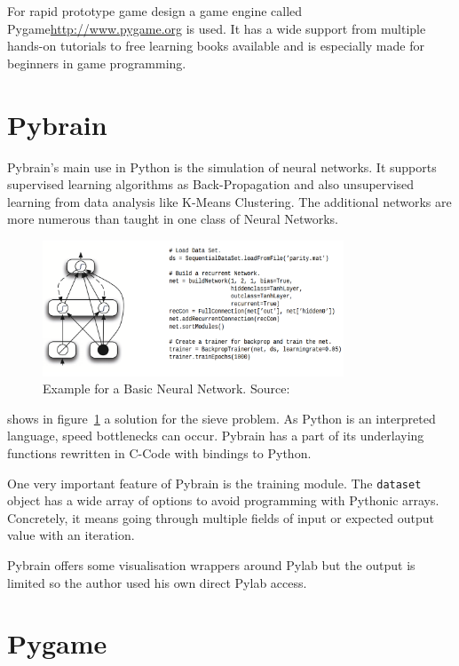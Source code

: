 \documentclass[bibtotocnumbered, headsepline,normalheadings,12pt]{report}
\begin{document}
For rapid prototype game design a game engine called Pygame\url{http://www.pygame.org} is used. It has a wide support from multiple 
hands-on tutorials to free learning books available and is especially made for beginners in game programming.

\section{Pybrain}

Pybrain's main use in Python is the simulation of neural networks. It supports supervised learning algorithms as Back-Propagation
and also unsupervised learning from data analysis like K-Means Clustering. The additional networks are more numerous than 
taught in one class of Neural Networks. 

\begin{figure}[H]
    \centering
    \includegraphics[width=0.8\textwidth]{nnet.png}%
    \caption{Example for a Basic Neural Network. Source: \cite{pybrain2010jmlr}}
    \label{fig:nnet}%
\end{figure}

\cite{pybrain2010jmlr} shows in figure~\ref{fig:nnet} a solution for the sieve problem. As Python is an interpreted language, 
speed bottlenecks can occur. Pybrain has a part of its underlaying functions rewritten in C-Code with bindings to Python.

One very important feature of Pybrain is the training module. The \texttt{dataset} object has a wide array of options to avoid programming
with Pythonic arrays. Concretely, it means going through multiple fields of input or expected output value with an iteration. 

Pybrain offers some visualisation wrappers around Pylab but the output is limited so the author used his own direct Pylab access.

\section{Pygame}
\end{document}
